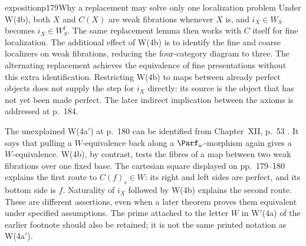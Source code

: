 \begin{dcomment}{exposition}{p179}{Why a replacement may solve only one localization problem}
Under W(4b), both $X$ and $C(X)$ are weak fibrations whenever $X$ is, and $i_X\in W_S$ becomes $i_X\in W_S^{\mathrm f}$. The same replacement lemma then works with $C$ itself for fine localization. The additional effect of W(4b) is to identify the fine and coarse localizers on weak fibrations, reducing the four-category diagram to three. The alternating replacement achieves the equivalence of fine presentations without this extra identification. Restricting W(4b) to maps between already perfect objects does not supply the step for $i_X$ directly: its source is the object that has not yet been made perfect. The later indirect implication between the axioms is addressed at p.~184.

The unexplained W(4a$'$) at p.~180 can be identified from Chapter~XII, p.~53 \citep{GrothendieckDerivateursXII}. It says that pulling a $W$-equivalence back along a $\Parf_\omega$-morphism again gives a $W$-equivalence. W(4b), by contrast, tests the fibres of a map between two weak fibrations over one fixed base. The cartesian square displayed on pp.~179--180 explains the first route to $C(f)_s\in W$: its right and left sides are perfect, and its bottom side is $f$. Naturality of $i_X$ followed by W(4b) explains the second route. These are different assertions, even when a later theorem proves them equivalent under specified assumptions. The prime attached to the letter $W$ in W$'$(4a) of the earlier footnote should also be retained; it is not the same printed notation as W(4a$'$).
\end{dcomment}

